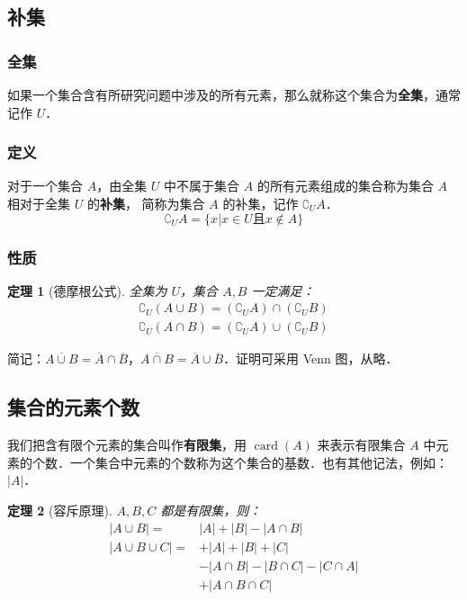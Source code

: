 \documentclass[a4paper,openany]{ctexbook}
\newtheorem{thmlevel1}{定理}[chapter]
\DeclareMathOperator{\card}{card}
\begin{document}
\subsection{补集}

\subsubsection{全集}

如果一个集合含有所研究问题中涉及的所有元素，那么就称这个集合为\textbf{全集}，通常记作 \(U\)．

\subsubsection{定义}

对于一个集合 \(A\)，由全集 \(U\) 中不属于集合 \(A\) 的所有元素组成的集合称为集合 \(A\) 相对于全集 \(U\) 的\textbf{补集}，
简称为集合 \(A\) 的补集，记作 \(\complement_U A\)．
\[
    \complement_U A = \{x| x\in U \text{且}x\not\in A\}
\]

\subsubsection{性质}

\begin{thmlevel1}[德摩根公式]\label{thm:demorgan}
    全集为 \(U\)，集合 \(A,B\) 一定满足：
    \begin{gather*}
        \complement_U(A\cup B)=(\complement_U A)\cap(\complement_U B)\\
        \complement_U(A\cap B)=(\complement_U A)\cup(\complement_U B)
    \end{gather*}
\end{thmlevel1}

简记：\(\overline{A\cup B}=\overline{A}\cap \overline{B}\)，\(\overline{A\cap B}=\overline{A}\cup \overline{B} \)．证明可采用 Venn 图，从略．

\subsection{集合的元素个数}

我们把含有限个元素的集合叫作\textbf{有限集}，用 \(\card(A)\) 来表示有限集合 \(A\) 中元素的个数．一个集合中元素的个数称为这个集合的基数．也有其他记法，例如：\(|A|\)．

\begin{thmlevel1}[容斥原理]
    \(A,B,C\) 都是有限集，则：
    \begin{align*}
        |A\cup B|={}       & |A|+|B|-|A\cap B|               \\
        |A\cup B\cup C|={} & + |A|+|B|+|C|                   \\
                           & - |A\cap B|-|B\cap C|-|C\cap A| \\
                           & + |A\cap B\cap C|
    \end{align*}
\end{thmlevel1}
\end{document}
